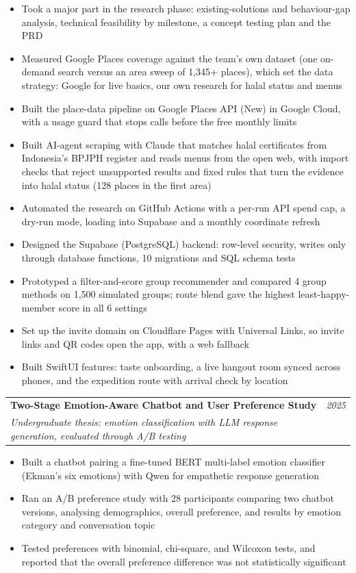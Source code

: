 \documentclass[a4paper,11pt]{article}
\makeatletter
\newcommand{\resumeProject}[4]{
\vspace{0.5mm}\item
    \begin{tabular*}{0.98\textwidth}[t]{l@{\extracolsep{\fill}}r}
        \textbf{#1} & \textit{\footnotesize{#3}} \\
        \footnotesize{\textit{#2}} & \footnotesize{#4}
    \end{tabular*}
    \vspace{-2.4mm}
}
\newcommand{\resumeItemListStart}{\begin{justify}\begin{itemize}[leftmargin=3ex, rightmargin=2ex, noitemsep,labelsep=1.2mm,itemsep=0mm]\small}
\newcommand{\resumeItemListEnd}{\end{itemize}\end{justify}\vspace{-2mm}}
\makeatother
\begin{document}
  \resumeItemListStart
    \item {Took a major part in the research phase: existing-solutions and behaviour-gap analysis, technical feasibility by milestone, a concept testing plan and the PRD}
    \item {Measured Google Places coverage against the team's own dataset (one on-demand search versus an area sweep of 1,345+ places), which set the data strategy: Google for live basics, our own research for halal status and menus}
    \item {Built the place-data pipeline on Google Places API (New) in Google Cloud, with a usage guard that stops calls before the free monthly limits}
    \item {Built AI-agent scraping with Claude that matches halal certificates from Indonesia's BPJPH register and reads menus from the open web, with import checks that reject unsupported results and fixed rules that turn the evidence into halal status (128 places in the first area)}
    \item {Automated the research on GitHub Actions with a per-run API spend cap, a dry-run mode, loading into Supabase and a monthly coordinate refresh}
    \item {Designed the Supabase (PostgreSQL) backend: row-level security, writes only through database functions, 10 migrations and SQL schema tests}
    \item {Prototyped a filter-and-score group recommender and compared 4 group methods on 1,500 simulated groups; route blend gave the highest least-happy-member score in all 6 settings}
    \item {Set up the invite domain on Cloudflare Pages with Universal Links, so invite links and QR codes open the app, with a web fallback}
    \item {Built SwiftUI features: taste onboarding, a live hangout room synced across phones, and the expedition route with arrival check by location}
  \resumeItemListEnd
  \vspace{-2mm}

\resumeProject
  {Two-Stage Emotion-Aware Chatbot and User Preference Study}
  {Undergraduate thesis: emotion classification with LLM response generation, evaluated through A/B testing}
  {2025}{}

  \resumeItemListStart
    \item {Built a chatbot pairing a fine-tuned BERT multi-label emotion classifier (Ekman's six emotions) with Qwen for empathetic response generation}
    \item {Ran an A/B preference study with 28 participants comparing two chatbot versions, analysing demographics, overall preference, and results by emotion category and conversation topic}
    \item {Tested preferences with binomial, chi-square, and Wilcoxon tests, and reported that the overall preference difference was not statistically significant}
  \resumeItemListEnd
  \vspace{-2mm}
\end{document}
